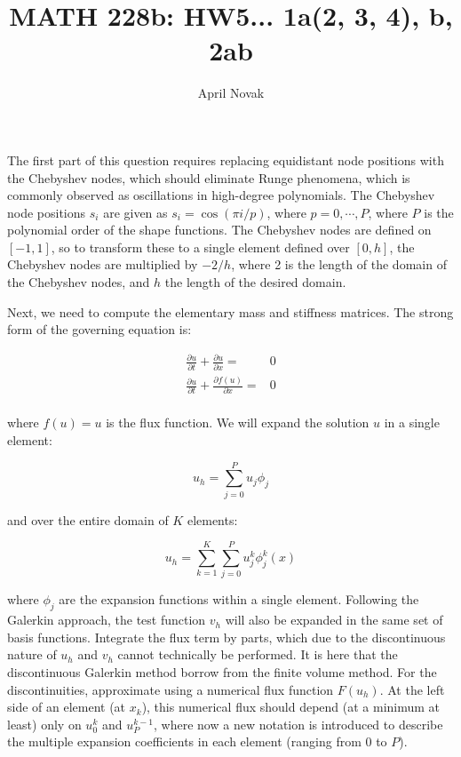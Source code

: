\documentclass[10pt]{article}
\newcommand{\beq}{\begin{equation}}
\newcommand{\eeq}{\end{equation}}
\newcommand{\beqa}{\begin{equation}\begin{aligned}}
\newcommand{\eeqa}{\end{aligned}\end{equation}}
\begin{document}
\title{MATH 228b: HW5... 1a(2, 3, 4), b, 2ab}
\author{April Novak}

\maketitle

\section{}

The first part of this question requires replacing equidistant node positions with the Chebyshev nodes, which should eliminate Runge phenomena, which is commonly observed as oscillations in high-degree polynomials. The Chebyshev node positions \(s_i\) are given as \(s_i=\cos{(\pi i/p)}\), where \(p=0, \cdots, P\), where \(P\) is the polynomial order of the shape functions. The Chebyshev nodes are defined on \([-1, 1]\), so to transform these to a single element defined over \([0, h]\), the Chebyshev nodes are multiplied by \(-2/h\), where 2 is the length of the domain of the Chebyshev nodes, and \(h\) the length of the desired domain.

Next, we need to compute the elementary mass and stiffness matrices. The strong form of the governing equation is:

\beqa
\frac{\partial u}{\partial t}+\frac{\partial u}{\partial x}=&0\\
\frac{\partial u}{\partial t}+\frac{\partial f(u)}{\partial x}=&0\\
\eeqa

where \(f(u)=u\) is the flux function. We will expand the solution \(u\) in a single element:

\beq
u_h=\sum_{j=0}^{P}u_j\phi_j
\eeq

and over the entire domain of \(K\) elements:

\beq
u_h=\sum_{k=1}^{K}\sum_{j=0}^{P}u_j^k\phi_j^k(x)
\eeq

where \(\phi_j\) are the expansion functions within a single element. Following the Galerkin approach, the test function \(v_h\) will also be expanded in the same set of basis functions. Integrate the flux term by parts, which due to the discontinuous nature of \(u_h\) and \(v_h\) cannot technically be performed. It is here that the discontinuous Galerkin method borrow from the finite volume method. For the discontinuities, approximate using a numerical flux function \(F(u_h)\). At the left side of an element (at \(x_{k}\)), this numerical flux should depend (at a minimum at least) only on \(u_0^k\) and \(u_P^{k-1}\), where now a new notation is introduced to describe the multiple expansion coefficients in each element (ranging from 0 to \(P\)). 
\end{document}
